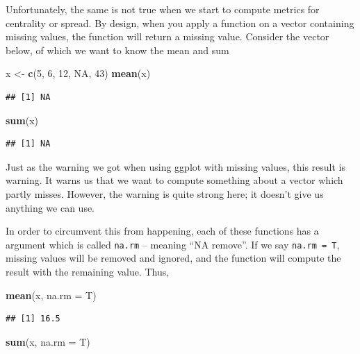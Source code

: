 \documentclass[]{tufte-book}
\newenvironment{Shaded}{}{}
\newcommand{\DataTypeTok}[1]{\textcolor[rgb]{0.56,0.13,0.00}{#1}}
\newcommand{\DecValTok}[1]{\textcolor[rgb]{0.25,0.63,0.44}{#1}}
\newcommand{\KeywordTok}[1]{\textcolor[rgb]{0.00,0.44,0.13}{\textbf{#1}}}
\newcommand{\NormalTok}[1]{#1}
\newcommand{\OtherTok}[1]{\textcolor[rgb]{0.00,0.44,0.13}{#1}}
\newcommand{\StringTok}[1]{\textcolor[rgb]{0.25,0.44,0.63}{#1}}
\begin{document}
Unfortunately, the same is not true when we start to compute metrics for centrality or spread. By design, when you apply a function on a vector containing missing values, the function will return a missing value. Consider the vector below, of which we want to know the mean and sum

\begin{Shaded}
\begin{Highlighting}[]
\NormalTok{x <-}\StringTok{ }\KeywordTok{c}\NormalTok{(}\DecValTok{5}\NormalTok{, }\DecValTok{6}\NormalTok{, }\DecValTok{12}\NormalTok{, }\OtherTok{NA}\NormalTok{, }\DecValTok{43}\NormalTok{)}
\KeywordTok{mean}\NormalTok{(x)}
\end{Highlighting}
\end{Shaded}

\begin{verbatim}
## [1] NA
\end{verbatim}

\begin{Shaded}
\begin{Highlighting}[]
\KeywordTok{sum}\NormalTok{(x)}
\end{Highlighting}
\end{Shaded}

\begin{verbatim}
## [1] NA
\end{verbatim}

Just as the warning we got when using ggplot with missing values, this result is warning. It warns us that we want to compute something about a vector which partly misses. However, the warning is quite strong here; it doesn't give us anything we can use.

In order to circumvent this from happening, each of these functions has a argument which is called \texttt{na.rm} -- meaning ``NA remove''. If we say \texttt{na.rm\ =\ T}, missing values will be removed and ignored, and the function will compute the result with the remaining value. Thus,

\begin{Shaded}
\begin{Highlighting}[]
\KeywordTok{mean}\NormalTok{(x, }\DataTypeTok{na.rm =}\NormalTok{ T)}
\end{Highlighting}
\end{Shaded}

\begin{verbatim}
## [1] 16.5
\end{verbatim}

\begin{Shaded}
\begin{Highlighting}[]
\KeywordTok{sum}\NormalTok{(x, }\DataTypeTok{na.rm =}\NormalTok{ T)}
\end{Highlighting}
\end{Shaded}
\end{document}

